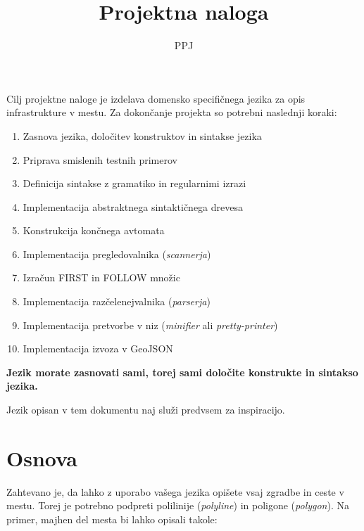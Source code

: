 \documentclass{article}
\title{Projektna naloga}
\author{PPJ}
\begin{document}
\maketitle

Cilj projektne naloge je izdelava domensko specifičnega jezika za opis infrastrukture v mestu.
Za dokončanje projekta so potrebni naslednji koraki:

\begin{enumerate}
\item Zasnova jezika, določitev konstruktov in sintakse jezika
\item Priprava smislenih testnih primerov
\item Definicija sintakse z gramatiko in regularnimi izrazi
\item Implementacija abstraktnega sintaktičnega drevesa
\item Konstrukcija končnega avtomata
\item Implementacija pregledovalnika (\emph{scannerja})
\item Izračun \textsc{FIRST} in \textsc{FOLLOW} množic
\item Implementacija razčelenejvalnika (\emph{parserja})
\item Implementacija pretvorbe v niz (\emph{minifier} ali \emph{pretty-printer})
\item Implementacija izvoza v GeoJSON
\end{enumerate}

\textbf{Jezik morate zasnovati sami, torej sami določite konstrukte in sintakso jezika.}

Jezik opisan v tem dokumentu naj služi predvsem za inspiracijo.

\newpage
\section{Osnova}
Zahtevano je, da lahko z uporabo vašega jezika opišete vsaj zgradbe in ceste v mestu.
Torej je potrebno podpreti polilinije (\emph{polyline}) in poligone (\emph{polygon}).
Na primer, majhen del mesta bi lahko opisali takole:
\end{document}
